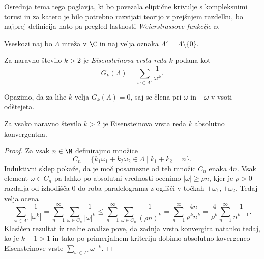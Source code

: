 Osrednja tema tega poglavja, ki bo povezala eliptične krivulje s kompleksnimi torusi in za katero je bilo potrebno razvijati teorijo v prejšnjem razdelku, bo najprej definicija nato pa pregled lastnosti \emph{Weierstrassove funkcije} $\wp$. 

Vseskozi naj bo $\Lambda$ mreža v $\C$ in naj velja oznaka $\Lambda' = \Lambda \setminus \{0\}$.

\begin{definicija}
    \label{eisensteinova vrsta}
    Za naravno število $k > 2$ je \emph{Eisensteinova vrsta reda $k$} podana kot
    \[
        G_k(\Lambda) = \sum_{\omega \in \Lambda'} \frac{1}{\omega^k}.  
    \]
\end{definicija}

\begin{opomba}
    Opazimo, da za lihe $k$ velja $G_k(\Lambda) = 0$, saj se člena pri $\omega$ in $-\omega$ v vsoti odštejeta. 
\end{opomba}

\begin{lema}
    \label{lema o konvergenci eisensteinove vrste}
    Za vsako naravno število $k > 2$ je Eisensteinova vrsta reda $k$ absolutno konvergentna.
\end{lema}

\begin{proof}
    Za vsak $n \in \N$ definirajmo množice
    \[
        C_n = \{k_1 \omega_1 + k_2 \omega_2\in \Lambda \mid {k_1} + {k_2} = n\}.  
    \]
    Induktivni sklep pokaže, da je moč posamezne od teh množic $C_n$ enaka $4n$.
    Vsak element $\omega \in C_n$ pa lahko po absolutni vrednosti ocenimo $\left\lvert \omega \right\rvert \geq \rho n$, kjer je $\rho > 0$ razdalja od izhodišča $0$ do roba paralelograma z oglišči v točkah $\pm \omega_1, \pm \omega_2$. Tedaj velja ocena
    \[
        \sum_{\omega \in \Lambda'} \frac{1}{\left\lvert  \omega^k \right\rvert} = 
        \sum_{n = 1}^\infty \sum_{\omega \in C_n} \frac{1}{\left\lvert  \omega \right\rvert^k} \leq
        \sum_{n = 1}^\infty \sum_{\omega \in C_n} \frac{1}{(\rho n)^k} =
        \sum_{n = 1}^\infty \frac{4n}{\rho^k n^k} = 
        \frac{4}{\rho^k} \sum_{n = 1}^\infty \frac{1}{n^{k-1}}.
    \]
    Klasičen rezultat iz realne analize pove, da zadnja vrsta konvergira natanko tedaj, ko je $k - 1 > 1$ in tako po primerjalnem kriteriju dobimo absolutno kovergenco Eisensteinove vrste $\sum_{\omega \in \Lambda'} \omega^{-k}$.
\end{proof}

